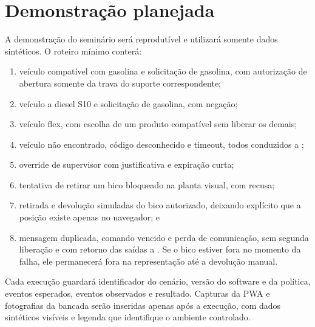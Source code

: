 \section{Demonstração planejada}
\label{sec:demonstracao}

A demonstração do seminário será reprodutível e utilizará somente dados
sintéticos. O roteiro mínimo conterá:

\begin{enumerate}
  \item veículo compatível com gasolina e solicitação de gasolina, com
  autorização de abertura somente da trava do suporte correspondente;
  \item veículo a diesel S10 e solicitação de gasolina, com negação;
  \item veículo flex, com escolha de um produto compatível sem liberar os demais;
  \item veículo não encontrado, código desconhecido e timeout, todos conduzidos
  a ;
  \item override de supervisor com justificativa e expiração curta;
  \item tentativa de retirar um bico bloqueado na planta visual, com recusa;
  \item retirada e devolução simuladas do bico autorizado, deixando explícito
  que a posição existe apenas no navegador; e
  \item mensagem duplicada, comando vencido e perda de comunicação, sem segunda
  liberação e com retorno das saídas a . Se o bico estiver fora
  no momento da falha, ele permanecerá fora na representação até a devolução
  manual.
\end{enumerate}

Cada execução guardará identificador do cenário, versão do software e da
política, eventos esperados, eventos observados e resultado. Capturas da PWA e
fotografias da bancada serão inseridas apenas após a execução, com dados
sintéticos visíveis e legenda que identifique o ambiente controlado.

